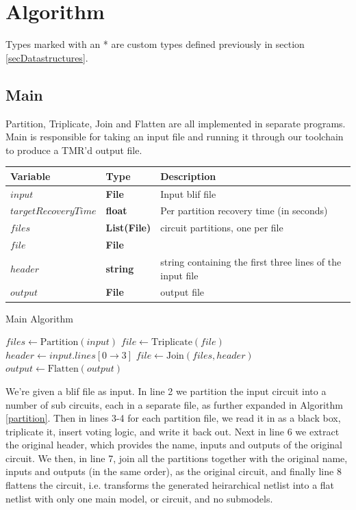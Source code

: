 \documentclass[12pt,final,oneside]{article} %
\begin{document}
\newpage
\section{Algorithm}
Types marked with an * are custom types defined previously in section \ref{secDatastructures}.
\subsection{Main}
Partition, Triplicate, Join and Flatten are all implemented in separate programs. Main is responsible for taking an input file and running it through our toolchain to produce a TMR'd output file.


\begin{algorithm}
    \begin{center}
        \begin{tabular}{lll}
        \toprule
        Variable & Type & Description\\
        \midrule
        $input$ & \bf{File} & Input blif file\\
        $targetRecoveryTime$ & \bf{float} & Per partition recovery time (in seconds) \\
        $files$ & \bf{List(File)} & circuit partitions, one per file \\
        $file$ & \bf{File} & \\
        $header$ & \bf{string} & string containing the first three lines of the input file \\
        $output$ & \bf{File} & output file\\
        \bottomrule
        \end{tabular}
    \end{center}
   \caption{Main Algorithm}\label{main}
   \begin{algorithmic}[1]
         \State $files \gets \mbox{Partition}(input)$
            \State $file \gets \mbox{Triplicate}(file)$
         \EndFor
         \State $header \gets input.lines[0\to 3]$
         \State $file \gets \mbox{Join}(files, header)$
         \State $output \gets \mbox{Flatten}(output)$
      \EndProcedure
   \end{algorithmic}
\end{algorithm}
We're given a blif file as input.
In line 2 we partition the input circuit into a number of sub circuits, each in a separate file, as further expanded in Algorithm \ref{partition}.
Then in lines 3-4 for each partition file, we read it in as a black box, triplicate it, insert voting logic, and write it back out.
Next in line 6 we extract the original header, which provides the name, inputs and outputs of the original circuit.
We then, in line 7, join all the partitions together with the original name, inputs and outputs (in the same order), as the original circuit, and finally line 8 flattens the circuit, i.e. transforms the generated heirarchical netlist into a flat netlist with only one main model, or circuit, and no submodels.
\end{document}
